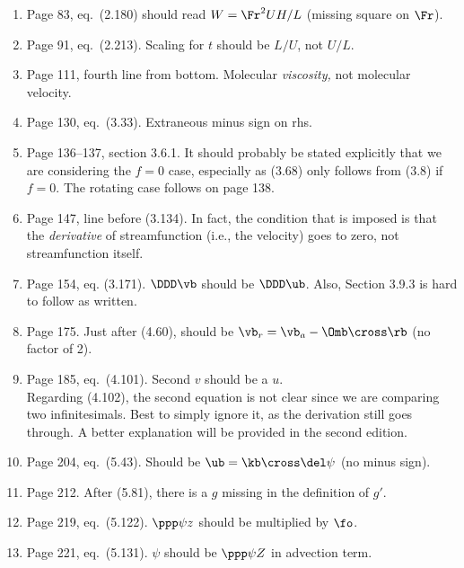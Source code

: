 \documentclass[10pt]{article}
\newcommand{\eq}{eq.\ } \newcommand{\Eq}{Eq.\ }
\begin{document}
\begin{enumerate}
\item Page 83, \eq (2.180) should read $W = \Fr^2 UH/L$ (missing square on $\Fr$).

\item Page 91, \eq (2.213). Scaling for $t$ should be $L/U$, not $U/L$.

\item Page 111, fourth line from bottom. Molecular \emph{viscosity,} not molecular velocity.

\item Page 130, \eq (3.33). Extraneous minus sign on rhs.

\item Page 136--137, section 3.6.1. It should probably be stated explicitly that we are considering the $f=0$ case, especially as (3.68) only follows from (3.8) if $f=0$. The rotating case follows on page 138. 

\item Page 147, line before (3.134). In fact, the condition that is imposed is that the \emph{derivative} of streamfunction (i.e., the velocity) goes to zero, not streamfunction itself. 

\item Page 154, eq. (3.171). $\DDD \vb$ should be $\DDD \ub$. Also, 
Section 3.9.3 is hard to follow as written. 

\item Page 175. Just after (4.60), should be $\vb_r = \vb_a - \Omb \cross \rb$ (no factor of 2).

\item Page 185, \eq (4.101). Second $v$ should be a $u$. \\ Regarding (4.102), the second equation is not clear since we are comparing two infinitesimals. Best to simply ignore it, as the derivation still goes through. A better explanation will be provided in the second edition. 

\item Page 204, \eq (5.43). Should be $\ub = \kb \cross \del \psi$ (no minus sign). 

\item Page 212. After (5.81), there is a $g$ missing in the definition of $g'$.

\item Page 219, \eq (5.122). $\ppp \psi z$ should be multiplied by $\fo$.

\item Page 221, \eq(5.131). $\psi$ should be $\ppp \psi Z$ in advection term.


\end{enumerate}
\end{document}
